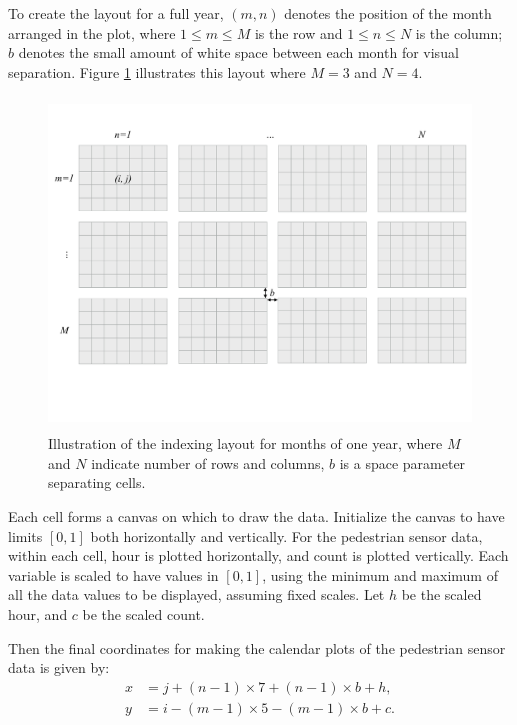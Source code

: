 \documentclass[12pt]{article}
\begin{document}
To create the layout for a full year, \((m, n)\) denotes the position of the month arranged in the plot, where \(1 \le m \le M\) is the row and \(1 \le n \le N\) is the column; \(b\) denotes the small amount of white space between each month for visual separation. Figure \ref{fig:year-diagram} illustrates this layout where \(M = 3\) and \(N = 4\).

\begin{figure}

{\centering \includegraphics[width=360pt,height=250pt]{img/year-diagram} 

}

\caption{Illustration of the indexing layout for months of one year, where \(M\) and \(N\) indicate number of rows and columns, \(b\) is a space parameter separating cells.}\label{fig:year-diagram}
\end{figure}



Each cell forms a canvas on which to draw the data. Initialize the canvas to have limits \([0, 1]\) both horizontally and vertically. For the pedestrian sensor data, within each cell, hour is plotted horizontally, and count is plotted vertically. Each variable is scaled to have values in \([0, 1]\), using the minimum and maximum of all the data values to be displayed, assuming fixed scales. Let \(h\) be the scaled hour, and \(c\) be the scaled count.

Then the final coordinates for making the calendar plots of the pedestrian sensor data is given by:
\begin{equation}
  \begin{aligned}
  x &= j + (n - 1) \times 7 + (n - 1) \times b + h, \\
  y &= i - (m - 1) \times 5 - (m - 1) \times b + c.
  \end{aligned}
  \label{eq:final}
\end{equation}
\end{document}
